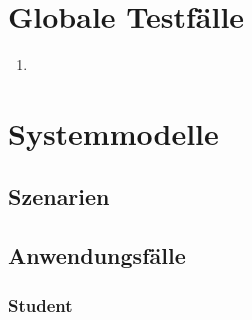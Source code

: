 \documentclass[parskip=full]{scrartcl}
\begin{document}
\section{Globale Testfälle}
\begin{enumerate}
  \item 
\end{enumerate}
\section{Systemmodelle}

\subsection{Szenarien}

\subsection{Anwendungsfälle}

\subsubsection{Student}
\end{document}

